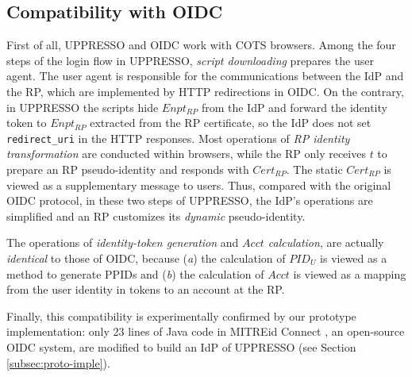 \subsection{Compatibility with OIDC}
\label{subsec:compatible}
First of all, UPPRESSO and OIDC work with COTS browsers.
Among the four steps of the login flow in UPPRESSO,
    \emph{script downloading} prepares the user agent.
The user agent is responsible for the communications between the IdP and the RP,
    which are implemented by HTTP redirections in OIDC.
On the contrary, in UPPRESSO the scripts hide $Enpt_{RP}$ from the IdP
    and forward the identity token to $Enpt_{RP}$ extracted from the RP certificate,
so the IdP does not set \verb+redirect_uri+ in the HTTP responses. %
Most operations of \emph{RP identity transformation} are conducted within browsers,
 while the RP only receives $t$ to prepare an RP pseudo-identity
  and responds with  $Cert_{RP}$.
The static $Cert_{RP}$ is viewed as a supplementary message to users.
Thus, compared with the original OIDC protocol, in these two steps of UPPRESSO, the IdP's operations are simplified
    and an RP customizes its \emph{dynamic} pseudo-identity.

The operations of \emph{identity-token generation} and \emph{$Acct$ calculation},
    are actually \emph{identical} to those of OIDC,
    because (\emph{a}) the calculation of $PID_U$ is viewed as a method to generate PPIDs
        and (\emph{b}) the calculation of $Acct$ is viewed as a mapping from the user identity in tokens
                    to an account at the RP.

Finally,
    this compatibility is experimentally confirmed by our prototype implementation:
     only 23 lines of Java code in MITREid Connect \cite{MITREid}, an open-source OIDC system,
 are modified
    to build an IdP of UPPRESSO (see Section \ref{subsec:proto-imple}).

